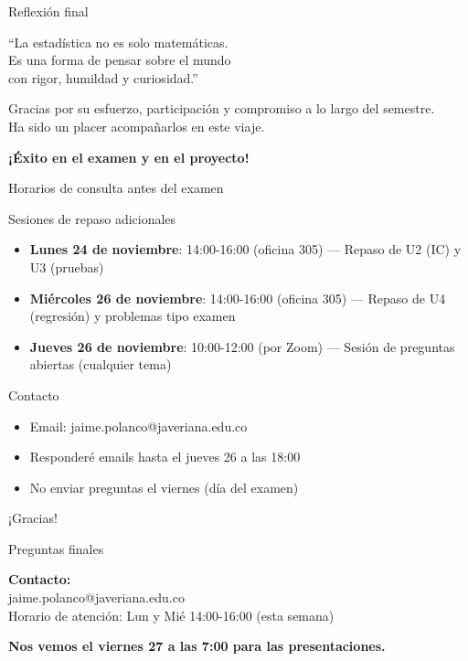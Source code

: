 \documentclass[aspectratio=169, 11pt]{beamer}
\begin{document}
\begin{frame}{Reflexión final}
\begin{center}
\Large
\textcolor{javeriana}{``La estadística no es solo matemáticas.\\Es una forma de pensar sobre el mundo\\con rigor, humildad y curiosidad.''}

\vspace{1cm}
\normalsize
Gracias por su esfuerzo, participación y compromiso a lo largo del semestre.\\
Ha sido un placer acompañarlos en este viaje.

\vspace{0.5cm}
\textbf{¡Éxito en el examen y en el proyecto!}
\end{center}
\end{frame}

\begin{frame}{Horarios de consulta antes del examen}
\begin{alertblock}{Sesiones de repaso adicionales}
\small
\begin{itemize}
\item \textbf{Lunes 24 de noviembre}: 14:00-16:00 (oficina 305) --- Repaso de U2 (IC) y U3 (pruebas)
\item \textbf{Miércoles 26 de noviembre}: 14:00-16:00 (oficina 305) --- Repaso de U4 (regresión) y problemas tipo examen
\item \textbf{Jueves 26 de noviembre}: 10:00-12:00 (por Zoom) --- Sesión de preguntas abiertas (cualquier tema)
\end{itemize}
\end{alertblock}

\begin{block}{Contacto}
\begin{itemize}
\item Email: jaime.polanco@javeriana.edu.co
\item Responderé emails hasta el jueves 26 a las 18:00
\item No enviar preguntas el viernes (día del examen)
\end{itemize}
\end{block}
\end{frame}

\begin{frame}{}
\begin{center}
\Huge ¡Gracias!

\vspace{1cm}
\Large Preguntas finales

\vspace{1.5cm}
\normalsize
\textbf{Contacto:}\\
jaime.polanco@javeriana.edu.co\\
Horario de atención: Lun y Mié 14:00-16:00 (esta semana)

\vspace{0.5cm}
\textbf{Nos vemos el viernes 27 a las 7:00 para las presentaciones.}
\end{center}
\end{frame}
\end{document}
